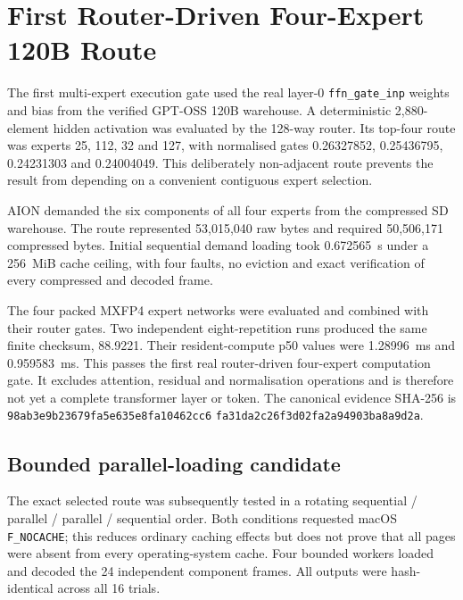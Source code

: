 \begingroup
\sloppy
\section{First Router-Driven Four-Expert 120B Route}
\label{sec:gptoss120b-router-driven-route}

The first multi-expert execution gate used the real layer-0
\texttt{ffn\_gate\_inp} weights and bias from the verified GPT-OSS 120B
warehouse.  A deterministic 2,880-element hidden activation was evaluated by
the 128-way router.  Its top-four route was experts 25, 112, 32 and 127, with
normalised gates 0.26327852, 0.25436795, 0.24231303 and 0.24004049.
This deliberately non-adjacent route prevents the result from depending on a
convenient contiguous expert selection.

AION demanded the six components of all four experts from the compressed SD
warehouse.  The route represented 53,015,040 raw bytes and required
50,506,171 compressed bytes.  Initial sequential demand loading took
0.672565~s under a 256~MiB cache ceiling, with four faults, no eviction and
exact verification of every compressed and decoded frame.

The four packed MXFP4 expert networks were evaluated and combined with their
router gates.  Two independent eight-repetition runs produced the same finite
checksum, 88.9221.  Their resident-compute p50 values were 1.28996~ms and
0.959583~ms.  This passes the first real router-driven four-expert computation
gate.  It excludes attention, residual and normalisation operations and is
therefore not yet a complete transformer layer or token.  The canonical
evidence SHA-256 is
\texttt{98ab3e9b23679fa5e635e8fa10462cc6}%
\allowbreak\texttt{fa31da2c26f3d02fa2a94903ba8a9d2a}.

\subsection{Bounded parallel-loading candidate}

The exact selected route was subsequently tested in a rotating sequential /
parallel / parallel / sequential order.  Both conditions requested macOS
\texttt{F\_NOCACHE}; this reduces ordinary caching effects but does not prove
that all pages were absent from every operating-system cache.  Four bounded
workers loaded and decoded the 24 independent component frames.  All outputs
were hash-identical across all 16 trials.

